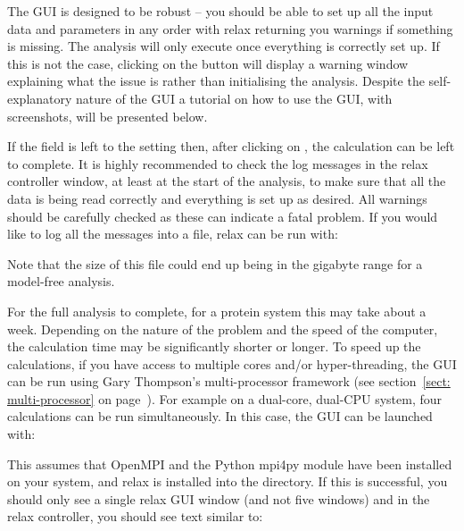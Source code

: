 The GUI is designed to be robust -- you should be able to set up all the input data and parameters in any order with relax returning you warnings if something is missing.
The analysis will only execute once everything is correctly set up.
If this is not the case, clicking on the  button will display a warning window explaining what the issue is rather than initialising the analysis.
Despite the self-explanatory nature of the GUI a tutorial on how to use the GUI, with screenshots, will be presented below.

If the  field is left to the  setting then, after clicking on , the calculation can be left to complete.
It is highly recommended to check the log messages in the relax controller window, at least at the start of the analysis, to make sure that all the data is being read correctly and everything is set up as desired.
All warnings should be carefully checked as these can indicate a fatal problem.
If you would like to log all the messages into a file, relax can be run with:


Note that the size of this  file could end up being in the gigabyte range for a model-free analysis.

For the full analysis to complete, for a protein system this may take about a week.
Depending on the nature of the problem and the speed of the computer, the calculation time may be significantly shorter or longer.
To speed up the calculations, if you have access to multiple cores and/or hyper-threading, the GUI can be run using Gary Thompson's multi-processor framework (see section~\ref{sect: multi-processor} on page~\pageref{sect: multi-processor}).
For example on a dual-core, dual-CPU system, four calculations can be run simultaneously.
In this case, the GUI can be launched with:


This assumes that OpenMPI and the Python mpi4py module have been installed on your system, and relax is installed into the  directory.
If this is successful, you should only see a single relax GUI window (and not five windows) and in the relax controller, you should see text similar to:


